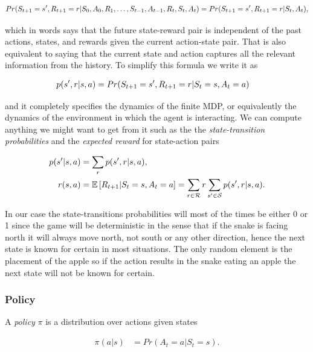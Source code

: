 \documentclass[result.tex]{subfiles}
\begin{document}
    \begin{align*}
        Pr(S_{t + 1} = s^\prime, R_{t + 1} = r | S_0, A_0, R_1, \ldots, S_{t - 1}, A_{t - 1}, R_t, S_t, A_t) = Pr(S_{t + 1} = s^\prime, R_{t + 1} = r | S_t, A_t),
    \end{align*}

    which in words says that the future state-reward pair is independent of the past actions, states, and rewards given the current action-state pair. That is also equivalent to saying that the current state and action captures all the relevant information from the history. To simplify this formula we write it as

    \begin{align*}
        p(s^\prime, r | s, a) &=
        Pr(S_{t + 1} = s^\prime, R_{t + 1} = r | S_t = s, A_t = a)
    \end{align*}

    and it completely specifies the dynamics of the finite MDP, or equivalently the dynamics of the environment in which the agent is interacting. We can compute anything we might want to get from it such as the the \textit{state-transition probabilities} and the \textit{expected reward} for state-action pairs

    \begin{align*}
        p(s^\prime | s, a) &=
        \sum_r p(s^\prime, r | s, a), \\
        r(s, a) &=
        \mathbb{E} \left[ R_{t + 1} | S_t = s, A_t = a \right] =
        \sum_{r \in \mathcal{R}} r \sum_{s^\prime \in \mathcal{S}} p(s^\prime, r | s, a).
    \end{align*}

    In our case the state-transitions probabilities will most of the times be either 0 or 1 since the game will be deterministic in the sense that if the snake is facing north it will always move north, not south or any other direction, hence the next state is known for certain in most situations. The only random element is the placement of the apple so if the action results in the snake eating an apple the next state will not be known for certain.

    \subsubsection*{Policy}

    A \textit{policy} $\pi$ is a distribution over actions given states

    \begin{align*}
        \pi(a | s) &= Pr(A_t = a | S_t = s).
    \end{align*}
\end{document}
